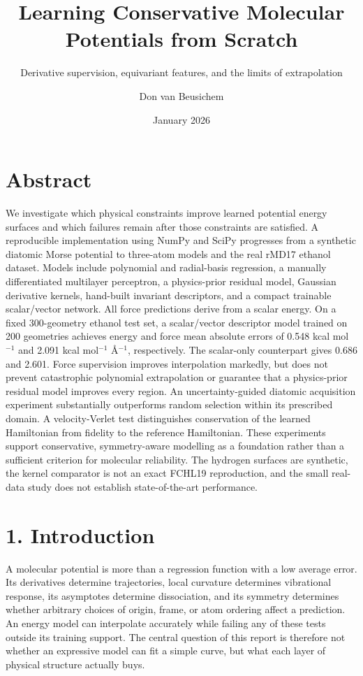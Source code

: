\documentclass[
  11pt,
  a4paper,
]{article}
\title{Learning Conservative Molecular Potentials from Scratch}
\subtitle{Derivative supervision, equivariant features, and the limits
of extrapolation}
\author{Don van Beusichem}
\date{January 2026}
\begin{document}
\maketitle

{
\hypersetup{linkcolor=}
\setcounter{tocdepth}{3}
\tableofcontents
}
\hypertarget{abstract}{%
\section{Abstract}\label{abstract}}

We investigate which physical constraints improve learned potential
energy surfaces and which failures remain after those constraints are
satisfied. A reproducible implementation using NumPy and SciPy
progresses from a synthetic diatomic Morse potential to three-atom
models and the real rMD17 ethanol dataset. Models include polynomial and
radial-basis regression, a manually differentiated multilayer
perceptron, a physics-prior residual model, Gaussian derivative kernels,
hand-built invariant descriptors, and a compact trainable scalar/vector
network. All force predictions derive from a scalar energy. On a fixed
300-geometry ethanol test set, a scalar/vector descriptor model trained
on 200 geometries achieves energy and force mean absolute errors of
0.548 kcal mol\(^{-1}\) and 2.091 kcal mol\(^{-1}\) Å\(^{-1}\),
respectively. The scalar-only counterpart gives 0.686 and 2.601. Force
supervision improves interpolation markedly, but does not prevent
catastrophic polynomial extrapolation or guarantee that a physics-prior
residual model improves every region. An uncertainty-guided diatomic
acquisition experiment substantially outperforms random selection within
its prescribed domain. A velocity-Verlet test distinguishes conservation
of the learned Hamiltonian from fidelity to the reference Hamiltonian.
These experiments support conservative, symmetry-aware modelling as a
foundation rather than a sufficient criterion for molecular reliability.
The hydrogen surfaces are synthetic, the kernel comparator is not an
exact FCHL19 reproduction, and the small real-data study does not
establish state-of-the-art performance.

\hypertarget{introduction}{%
\section{1. Introduction}\label{introduction}}

A molecular potential is more than a regression function with a low
average error. Its derivatives determine trajectories, local curvature
determines vibrational response, its asymptotes determine dissociation,
and its symmetry determines whether arbitrary choices of origin, frame,
or atom ordering affect a prediction. An energy model can interpolate
accurately while failing any of these tests outside its training
support. The central question of this report is therefore not whether an
expressive model can fit a simple curve, but what each layer of physical
structure actually buys.
\end{document}
